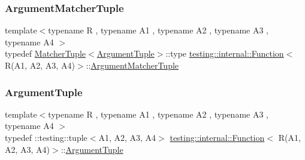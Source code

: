 \mbox{\label{structtesting_1_1internal_1_1_function_3_01_r_07_a1_00_01_a2_00_01_a3_00_01_a4_08_4_a9524b18868ab632a90d4cb6917057a14}} 
\subsubsection{\texorpdfstring{Argument\+Matcher\+Tuple}{ArgumentMatcherTuple}}
{\footnotesize\ttfamily template$<$typename R , typename A1 , typename A2 , typename A3 , typename A4 $>$ \\
typedef \hyperlink{structtesting_1_1internal_1_1_matcher_tuple}{Matcher\+Tuple}$<$\hyperlink{structtesting_1_1internal_1_1_function_3_01_r_07_08_4_ad483c3128c470d8cdb55c3ac1c575c11}{Argument\+Tuple}$>$\+::type \hyperlink{structtesting_1_1internal_1_1_function}{testing\+::internal\+::\+Function}$<$ R(A1, A2, A3, A4)$>$\+::\hyperlink{structtesting_1_1internal_1_1_function_3_01_r_07_08_4_a9bec5cf8937e8af99dedab2f40129fab}{Argument\+Matcher\+Tuple}}

\mbox{\label{structtesting_1_1internal_1_1_function_3_01_r_07_a1_00_01_a2_00_01_a3_00_01_a4_08_4_a8ad9e0ae57a766f80a9816ad45626812}} 
\subsubsection{\texorpdfstring{Argument\+Tuple}{ArgumentTuple}}
{\footnotesize\ttfamily template$<$typename R , typename A1 , typename A2 , typename A3 , typename A4 $>$ \\
typedef \+::testing\+::tuple$<$A1, A2, A3, A4$>$ \hyperlink{structtesting_1_1internal_1_1_function}{testing\+::internal\+::\+Function}$<$ R(A1, A2, A3, A4)$>$\+::\hyperlink{structtesting_1_1internal_1_1_function_3_01_r_07_08_4_ad483c3128c470d8cdb55c3ac1c575c11}{Argument\+Tuple}}

